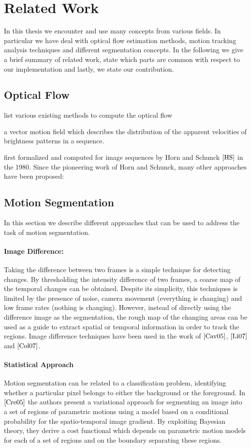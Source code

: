 \section{Related Work}
In this thesis we encounter and use many concepts from various fields. In particular we have deal with optical flow estimation methods, motion tracking analysis techniques and different segmentation concepts. In the following we give a brief summary of related work, state which parts are common with respect to our implementation and lastly, we state our contribution.

\subsection{Optical Flow}
list various existing methods to compute the optical flow

a vector motion field which describes the distribution of the apparent velocities of brightness patterns in a sequence. 

first formalized and computed  for  image  sequences  by  Horn  and  Schunck $\cite{HS}$ in  the  1980. Since the pioneering work of Horn and Schunck, many other approaches have been proposed:

\subsection{Motion Segmentation}
In this section we describe different approaches that can be used to address the task of motion segmentation.

\paragraph{Image Difference:} Taking the difference between two frames is a simple technique for detecting changes. By thresholding the intensity difference of two frames, a coarse map of the temporal changes can be obtained. Despite its simplicity, this techniques is limited by the presence of noise, camera movement (everything is changing) and low frame rates (nothing is changing). However, instead of directly using the difference image as the segmentation, the rough map of the changing areas can be used as a guide to extract spatial or temporal information in order to track the regions. Image difference techniques have been used in the work of $\cite{Cav05}$, $\cite{Li07}$ and $\cite{Col07}$.

\paragraph{Statistical Approach} Motion segmentation can be related to a classification problem, identifying whether a particular pixel belongs to either the background or the foreground. In $\cite{Cre05}$ the authors present a variational approach for segmenting an image into a set of regions of parametric motions using a model based on a conditional probability for the spatio-temporal image gradient. By exploiting Bayesian theory, they derive a cost functional which depends on parametric motion models for each  of a set of regions and on the boundary separating these regions.


